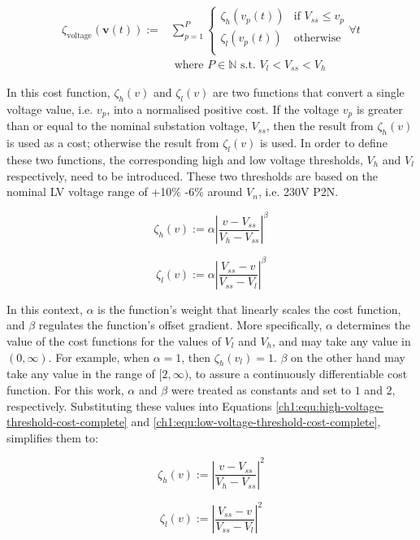 \begin{equation}
\begin{split}
	\zeta_\text{voltage}(\textbf{v}(t)) :=& \sum_{p=1}^{P}{\begin{cases}
		\zeta_h(v_{p}(t)) & \text{if } V_{ss} \leq v_p\\
		\zeta_l(v_{p}(t)) & \text{otherwise}\\
	\end{cases}} \forall t\\
	&\text{ where } P \in \mathbb{N} \text{ s.t. } V_l < V_{ss} < V_h
\end{split}
\label{ch1:equ:voltage-deviation}
\end{equation}

In this cost function, $\zeta_h(v)$ and $\zeta_l(v)$ are two functions that convert a single voltage value, i.e. $v_p$, into a normalised positive cost.
If the voltage $v_p$ is greater than or equal to the nominal substation voltage, $V_{ss}$, then the result from $\zeta_h(v)$ is used as a cost; otherwise the result from $\zeta_l(v)$ is used.
In order to define these two functions, the corresponding high and low voltage thresholds, $V_h$ and $V_l$ respectively, need to be introduced.
These two thresholds are based on the nominal LV voltage range of +10\% -6\% around $V_n$, i.e. 230V P2N.

\begin{equation}
	\zeta_h(v) := \alpha \left|\frac{v-V_{ss}}{V_h-V_{ss}}\right|^{\beta}
	\label{ch1:equ:high-voltage-threshold-cost-complete}
\end{equation}

\begin{equation}
	\zeta_l(v) := \alpha \left|\frac{V_{ss}-v}{V_{ss}-V_l}\right|^{\beta}
	\label{ch1:equ:low-voltage-threshold-cost-complete}
\end{equation}

In this context, $\alpha$ is the function's weight that linearly scales the cost function, and $\beta$ regulates the function's offset gradient.
More specifically, $\alpha$ determines the value of the cost functions for the values of $V_l$ and $V_h$, and may take any value in $(0, \infty)$.
For example, when $\alpha = 1$, then $\zeta_{h}(v_l) = 1$.
$\beta$ on the other hand may take any value in the range of $[2, \infty)$, to assure a continuously differentiable cost function.
For this work, $\alpha$ and $\beta$ were treated as constants and set to $1$ and $2$, respectively.
Substituting these values into Equations \ref{ch1:equ:high-voltage-threshold-cost-complete} and \ref{ch1:equ:low-voltage-threshold-cost-complete}, simplifies them to:

\begin{equation}
	\zeta_h(v) := \left|\frac{v-V_{ss}}{V_h-V_{ss}}\right|^{2}
	\label{ch1:equ:high-voltage-threshold-cost-simple}
\end{equation}

\begin{equation}
	\zeta_l(v) := \left|\frac{V_{ss}-v}{V_{ss}-V_l}\right|^{2}
	\label{ch1:equ:low-voltage-threshold-cost-simple}
\end{equation}
